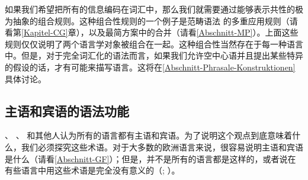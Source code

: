 如果我们希望把所有的信息编码在词汇中，那么我们就需要通过能够表示共性的极为抽象的组合规则。这种组合性规则的一个例子是范畴语法 的多重应用规则（请看第\ref{Kapitel-CG}章），以及最简方案\indexmpc 中的合并（请看\ref{Abschnitt-MP}）。上面这些规则仅仅说明了两个语言学对象被组合在一起。这种组合性当然存在于每一种语言中。但是，对于完全词汇化的语法而言，如果我们允许空中心语并且提出某些特异的假设的话，才有可能来描写语言。这将在\ref{Abschnitt-Phrasale-Konstruktionen}具体讨论。 

\subsection{主语和宾语的语法功能}
\label{Abschnitt-UG-EPP}

\mbox{} \citet[\page xxv]{BK82a}、 \citet[--237]{Pinker94a}、 \citet[]{Baker2003b}和其他人认为所有的语言都有主语和宾语。为了说明这个观点到底意味着什么，我们必须探究这些术语。对于大多数的欧洲语言来说，很容易说明主语和宾语是什么（请看\ref{Abschnitt-GF}）；但是，并不是所有的语言都是这样的，或者说在有些语言中用这些术语是完全没有意义的（\citealp[\S~4]{Croft2001a}; \citealp[\S~4]{EL2009a}）。


